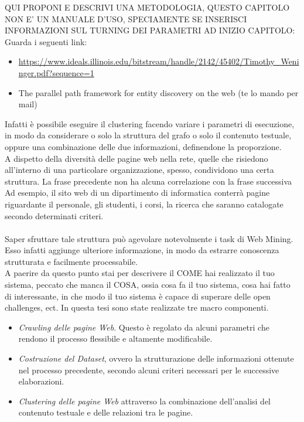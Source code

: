 \color{red}
QUI PROPONI E DESCRIVI UNA METODOLOGIA, QUESTO CAPITOLO NON E' UN MANUALE D'USO, SPECIAMENTE SE INSERISCI INFORMAZIONI SUL TURNING DEI PARAMETRI AD INIZIO CAPITOLO:
Guarda i seguenti link:
\begin{itemize}
\item \url{https://www.ideals.illinois.edu/bitstream/handle/2142/45402/Timothy_Weninger.pdf?sequence=1}
\item The parallel path framework for entity discovery on the web (te lo mando per mail)
\end{itemize}
Infatti è possibile eseguire il clustering facendo variare i parametri di esecuzione, in modo da considerare o solo la struttura del grafo o solo il contenuto testuale, oppure una combinazione delle due informazioni, definendone la proporzione.
\color{black}
\\
A dispetto della diversità delle pagine web nella rete, quelle che risiedono all'interno di una particolare organizzazione, spesso, condividono una certa struttura.
\color{red}
La frase precedente non ha alcuna correlazione con la frase successiva
Ad esempio, il sito web di un dipartimento di informatica conterrà pagine riguardante il personale, gli studenti, i corsi, la ricerca che saranno catalogate secondo determinati criteri. 
\color{black}
\\\\
Saper sfruttare tale struttura può agevolare notevolmente i task di Web Mining. Esso infatti aggiunge ulteriore informazione, in modo da estrarre conoscenza strutturata e facilmente processabile.
\\

\color{red}
A paerire da questo punto stai per descrivere il COME hai realizzato il tuo sistema, peccato che manca il COSA, ossia cosa fa il tuo sistema, cosa hai fatto di interessante, in che modo il tuo sistema è capace di superare delle open challenges, ect.
\color{black}
In questa tesi sono state realizzate tre macro componenti.
\begin{itemize}
\item \textit{Crawling delle pagine Web}. Questo è regolato da alcuni parametri che rendono il processo flessibile e altamente modificabile.
\item \textit{Costruzione del Dataset}, ovvero la strutturazione delle informazioni ottenute nel processo precedente, secondo alcuni criteri necessari per le successive elaborazioni.
\item \textit{Clustering delle pagine Web} attraverso la combinazione dell'analisi del contenuto testuale e delle relazioni tra le pagine.
\end{itemize}

